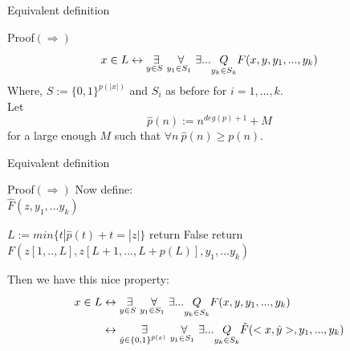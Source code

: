         \begin{frame}{Equivalent definition}
            \begin{block}{Proof$(\Rightarrow)$}
                $$x \in L \leftrightarrow 
                \overset{{}}{\underset{{y \in S\ }}{\Large \exists}}
                \overset{{}}{\underset{{y_1 \in S_1\ }}{\Large \forall}}
                \exists ...\underset{y_k \in S_k}{Q} F(x,y,y_1,...,y_k)$$
                Where, $S:= \{0,1\}^{p(|x|)}$ and $S_i$ as before for 
                $i= 1 ,... ,k$. \\
                Let $$\hat{p}(n):= n^{deg(p)+1}+M $$ 
                for a large enough $M$ such that
                $\forall n\ \hat{p}(n) \geq p(n)$.
            \end{block}
        \end{frame}

        \begin{frame}{Equivalent definition}
            \begin{block}{Proof$(\Rightarrow)$}
                Now define:\\
                $\hat{F}(z,y_1,...y_k)$
                \begin{algorithmic}[1]
                    \State $L := min\{t|\hat{p}(t)+t=|z|\}$
                        \State return False
                    \EndIf
                    \State return $F(z[1,..,L],z[L+1,...,L+p(L)],y_1,...y_k)$
                \end{algorithmic}
                Then we have this nice property:
                \begin{align*}
                x \in L  
                & \leftrightarrow 
                \overset{{}}{\underset{{y \in S\ }}{\Large \exists}}
                \overset{{}}{\underset{{y_1 \in S_1\ }}{\Large \forall}}
                \exists ...\underset{y_k \in S_k}{Q} F(x,y,y_1,...,y_k) \\
                & \leftrightarrow
                \overset{{}}{\underset{{\hat{y} \in {\{0,1\}}^{\hat{p}(x)}\ }}{\Large \exists}}
                \overset{{}}{\underset{{y_1 \in S_1\ }}{\Large \forall}}
                \exists ...\underset{y_k \in S_k}{Q} 
                \hat{F}(<x,\hat{y}>,y_1,...,y_k)
                \end{align*}
            \end{block}
        \end{frame}

